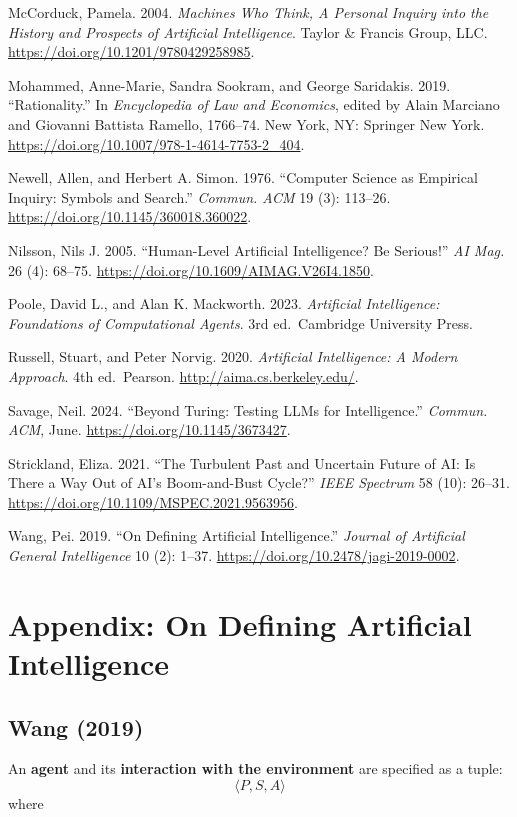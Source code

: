 \documentclass[
  letterpaper,
  DIV=11,
  numbers=noendperiod]{scrartcl}
\begin{document}
McCorduck, Pamela. 2004. \emph{{Machines Who Think, A Personal Inquiry
into the History and Prospects of Artificial Intelligence}}. Taylor \&
Francis Group, LLC. \url{https://doi.org/10.1201/9780429258985}.

Mohammed, Anne-Marie, Sandra Sookram, and George Saridakis. 2019.
``Rationality.'' In \emph{Encyclopedia of Law and Economics}, edited by
Alain Marciano and Giovanni Battista Ramello, 1766--74. New York, NY:
Springer New York. \url{https://doi.org/10.1007/978-1-4614-7753-2_404}.

Newell, Allen, and Herbert A. Simon. 1976. ``Computer Science as
Empirical Inquiry: Symbols and Search.'' \emph{Commun. ACM} 19 (3):
113--26. \url{https://doi.org/10.1145/360018.360022}.

Nilsson, Nils J. 2005. ``Human-Level Artificial Intelligence? Be
Serious!'' \emph{AI Mag.} 26 (4): 68--75.
\url{https://doi.org/10.1609/AIMAG.V26I4.1850}.

Poole, David L., and Alan K. Mackworth. 2023. \emph{Artificial
Intelligence: Foundations of Computational Agents}. 3rd ed.~Cambridge
University Press.

Russell, Stuart, and Peter Norvig. 2020. \emph{Artificial Intelligence:
A Modern Approach}. 4th ed.~Pearson. \url{http://aima.cs.berkeley.edu/}.

Savage, Neil. 2024. ``Beyond Turing: Testing LLMs for Intelligence.''
\emph{Commun. ACM}, June. \url{https://doi.org/10.1145/3673427}.

Strickland, Eliza. 2021. ``The Turbulent Past and Uncertain Future of
AI: Is There a Way Out of AI's Boom-and-Bust Cycle?'' \emph{IEEE
Spectrum} 58 (10): 26--31.
\url{https://doi.org/10.1109/MSPEC.2021.9563956}.

Wang, Pei. 2019. ``On Defining Artificial Intelligence.'' \emph{Journal
of Artificial General Intelligence} 10 (2): 1--37.
\url{https://doi.org/10.2478/jagi-2019-0002}.

\section{Appendix: On Defining Artificial
Intelligence}\label{appendix-on-defining-artificial-intelligence}

\subsection{Wang (2019)}\label{wang-2019}

An \textbf{agent} and its \textbf{interaction with the environment} are
specified as a tuple: \[
\langle P,S,A \rangle
\] where
\end{document}
